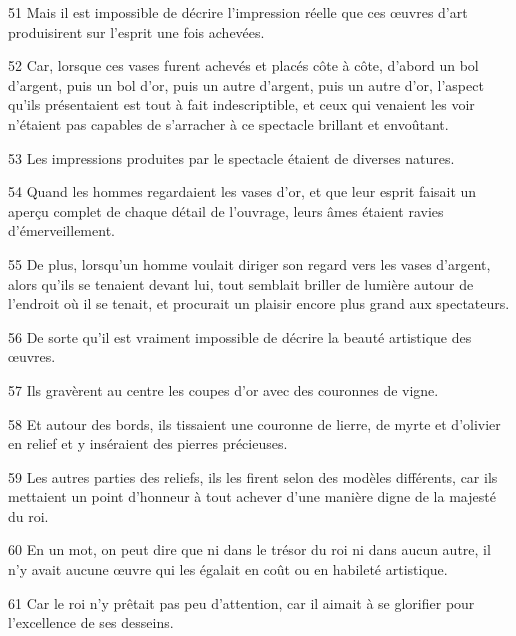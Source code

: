 \par 51 Mais il est impossible de décrire l'impression réelle que ces œuvres d'art produisirent sur l'esprit une fois achevées.

\par 52 Car, lorsque ces vases furent achevés et placés côte à côte, d'abord un bol d'argent, puis un bol d'or, puis un autre d'argent, puis un autre d'or, l'aspect qu'ils présentaient est tout à fait indescriptible, et ceux qui venaient les voir n'étaient pas capables de s'arracher à ce spectacle brillant et envoûtant.

\par 53 Les impressions produites par le spectacle étaient de diverses natures.

\par 54 Quand les hommes regardaient les vases d'or, et que leur esprit faisait un aperçu complet de chaque détail de l'ouvrage, leurs âmes étaient ravies d'émerveillement.

\par 55 De plus, lorsqu'un homme voulait diriger son regard vers les vases d'argent, alors qu'ils se tenaient devant lui, tout semblait briller de lumière autour de l'endroit où il se tenait, et procurait un plaisir encore plus grand aux spectateurs.

\par 56 De sorte qu'il est vraiment impossible de décrire la beauté artistique des œuvres.

\par 57 Ils gravèrent au centre les coupes d'or avec des couronnes de vigne.

\par 58 Et autour des bords, ils tissaient une couronne de lierre, de myrte et d'olivier en relief et y inséraient des pierres précieuses.

\par 59 Les autres parties des reliefs, ils les firent selon des modèles différents, car ils mettaient un point d'honneur à tout achever d'une manière digne de la majesté du roi.

\par 60 En un mot, on peut dire que ni dans le trésor du roi ni dans aucun autre, il n'y avait aucune œuvre qui les égalait en coût ou en habileté artistique.

\par 61 Car le roi n'y prêtait pas peu d'attention, car il aimait à se glorifier pour l'excellence de ses desseins.

